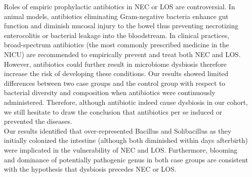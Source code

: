 \documentclass[fleqn,10pt]{wlpeerj} %
\begin{document}
\noindent
Roles of empiric prophylactic antibiotics in NEC or LOS are controversial. In animal models, antibiotics eliminating Gram-negative bacteria enhance gut function and diminish mucosal injury to the bowel thus preventing necrotizing enterocolitis or bacterial leakage into the bloodstream\citep{carlisle2011gram, jensen2013antibiotics, birck2015enteral}. In clinical practices, broad-spectrum antibiotics (the most commonly prescribed medicine in the NICU) are recommended to empirically prevent and treat both NEC and LOS\citep{bury2001enteral, brook2008microbiology, kimberlin2018red}. However, antibiotics could further result in microbiome dysbiosis therefore increase the risk of developing these conditions\citep{gibson2015antibiotics, kuppala2011prolonged, martinez2017early, cantey2018early}. Our results showed limited differences between two case groups and the control group with respect to bacterial diversity and composition when antibiotics were continuously administered. Therefore, although antibiotic indeed cause dysbiosis in our cohort, we still hesitate to draw the conclusion that antibiotics per se induced or prevented the diseases.\\

\noindent
Our results identified that over-represented Bacillus and Solibacillus as they initially colonized the intestine (although both diminished within days afterbirth) were implicated in the vulnerability of NEC and LOS. Furthermore, blooming and dominance of potentially pathogenic genus in both case groups are consistent with the hypothesis that dysbiosis precedes NEC or LOS.\\

\noindent







\end{document}
